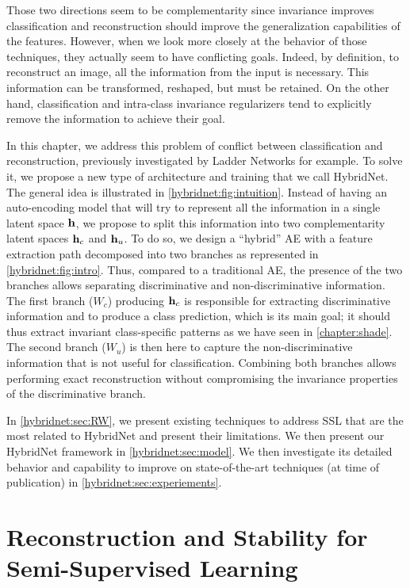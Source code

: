 Those two directions seem to be complementarity since invariance improves classification and reconstruction should improve the generalization capabilities of the features. However, when we look more closely at the behavior of those techniques, they actually seem to have conflicting goals. Indeed, by definition, to reconstruct an image, all the information from the input is necessary. This information can be transformed, reshaped, but must be retained. On the other hand, classification and intra-class invariance regularizers tend to explicitly remove the information to achieve their goal.

In this chapter, we address this problem of conflict between classification and reconstruction, previously investigated by Ladder Networks \citep{Rasmus2015} for example. To solve it, we propose a new type of architecture and training that we call HybridNet. The general idea is illustrated in \autoref{hybridnet:fig:intuition}. Instead of having an auto-encoding model that will try to represent all the information in a single latent space $\mathbf{h}$, we propose to split this information into two complementarity latent spaces $\mathbf{h}_c$ and $\mathbf{h}_u$. To do so, we design a ``hybrid'' \acf{AE} with a feature extraction path decomposed into two branches as represented in \autoref{hybridnet:fig:intro}. Thus, compared to a traditional \ac{AE}, the presence of the two branches allows separating discriminative and non-discriminative information. The first branch ($W_c$) producing $\mathbf{h}_c$ is responsible for extracting discriminative information and to produce a class prediction, which is its main goal; it should thus extract invariant class-specific patterns as we have seen in \autoref{chapter:shade}. The second branch ($W_u$) is then here to capture the non-discriminative information that is not useful for classification. Combining both branches allows performing exact reconstruction without compromising the invariance properties of the discriminative branch.

In \autoref{hybridnet:sec:RW}, we present existing techniques to address \ac{SSL} that are the most related to HybridNet and present their limitations. We then present our HybridNet framework in \autoref{hybridnet:sec:model}. We then investigate its detailed behavior and capability to improve on state-of-the-art techniques (at time of publication) in \autoref{hybridnet:sec:experiements}.


\section{Reconstruction and Stability for Semi-Supervised Learning} \label{hybridnet:sec:RW}

